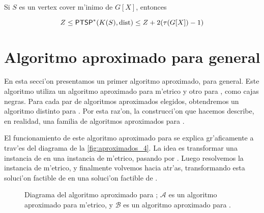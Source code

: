 \begin{corollary}
Si $S$ es un vertex cover m'inimo de $G[X]$, entonces

\[Z \leq \textnormal{\textsf{PTSP}}^*(K(S), \textnormal{dist}) \leq Z + 2(\tau(G[X]) - 1)\]
\end{corollary}

\section{Algoritmo aproximado para  general}

En esta secci'on presentamos un primer algoritmo aproximado, para  general. Este algoritmo utiliza un algoritmo aproximado para  m'etrico y otro para , como cajas negras. Para cada par de algoritmos aproximados elegidos, obtendremos un algoritmo distinto para . Por esta raz'on, la construcci'on que hacemos describe, en realidad, una familia de algoritmos aproximados para .

El funcionamiento de este algoritmo aproximado para  se explica gr'aficamente a trav'es del diagrama de la \autoref{fig:aproximados_4}. La idea es transformar una instancia de  en una instancia de  m'etrico, pasando por . Luego resolvemos la instancia de  m'etrico, y finalmente volvemos hacia atr'as, transformando esta soluci'on factible de  en una soluci'on factible de .

\begin{figure}[h]
	\begin{center}
		
	\end{center}		
	\caption{Diagrama del algoritmo aproximado para ; $\mathcal{A}$ es un algoritmo aproximado para  m'etrico, y $\mathcal{B}$ es un algoritmo aproximado para .}
	\label{fig:aproximados_4}
\end{figure}

